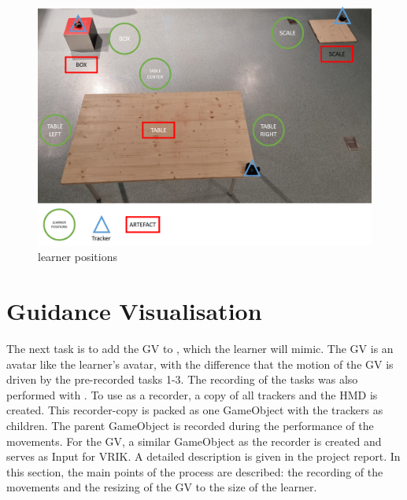 \begin{figure}[htb]
	\centering
	\includegraphics[width=\textwidth]{figures/learner_positions.png}
	\caption[learner positions]{learner positions}
	\label{fig:learner_positions}
\end{figure}

\section{Guidance Visualisation}
\label{sec:gv}
The next task is to add the GV to \exgo, which the learner will mimic. The GV is an avatar like the learner's avatar, with the difference that the motion of the GV is driven by the pre-recorded tasks 1-3. The recording of the tasks was also performed with \exgo. To use \exgo as a recorder, a copy of all trackers and the HMD is created. This recorder-copy is packed as one GameObject with the trackers as children. The parent GameObject is recorded during the performance of the movements. For the GV, a similar GameObject as the recorder is created and serves as Input for VRIK. A detailed description is given in the project report. In this section, the main points of the process are described: the recording of the movements and the resizing of the GV to the size of the learner.\\

